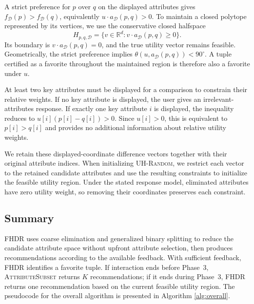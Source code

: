 A strict preference for $p$ over $q$ on the displayed attributes gives $f_{\mathcal{D}}(p)>f_{\mathcal{D}}(q)$, equivalently $u\cdot a_{\mathcal{D}}(p,q)>0$. To maintain a closed polytope represented by its vertices, we use the conservative closed halfspace
\[
H_{p,q,\mathcal{D}}=\{v\in\mathbb{R}^d:v\cdot a_{\mathcal{D}}(p,q)\geq0\}.
\]
Its boundary is $v\cdot a_{\mathcal{D}}(p,q)=0$, and the true utility vector remains feasible. Geometrically, the strict preference implies $\theta(u,a_{\mathcal{D}}(p,q))<90^\circ$. A tuple certified as a favorite throughout the maintained region is therefore also a favorite under $u$.

At least two key attributes must be displayed for a comparison to constrain their relative weights. If no key attribute is displayed, the user gives an irrelevant-attributes response. If exactly one key attribute $i$ is displayed, the inequality reduces to $u[i](p[i]-q[i])>0$. Since $u[i]>0$, this is equivalent to $p[i]>q[i]$ and provides no additional information about relative utility weights.

We retain these displayed-coordinate difference vectors together with their original attribute indices. When initializing \textsc{UH-Random}, we restrict each vector to the retained candidate attributes and use the resulting constraints to initialize the feasible utility region. Under the stated response model, eliminated attributes have zero utility weight, so removing their coordinates preserves each constraint.

\subsection{Summary}
\label{subsec:sum}

FHDR uses coarse elimination and generalized binary splitting to reduce the candidate attribute space without upfront attribute selection, then produces recommendations according to the available feedback. With sufficient feedback, FHDR identifies a favorite tuple. If interaction ends before Phase~3, \textsc{AttributeSubset} returns $K$ recommendations; if it ends during Phase~3, FHDR returns one recommendation based on the current feasible utility region. The pseudocode for the overall algorithm is presented in Algorithm \ref{alg:overall}.

\FloatBarrier
